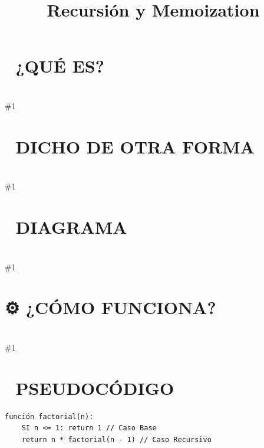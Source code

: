 \documentclass{article}
\newcommand{\quees}[1]{\section*{🤔 ¿QUÉ ES?}\hrulefill \\ \#1}
\newcommand{\dichodeotraforma}[1]{\section*{💬 DICHO DE OTRA FORMA}\hrulefill \\ \#1}
\newcommand{\diagrama}[1]{\section*{🎨 DIAGRAMA}\hrulefill \\ \#1}
\newcommand{\comofunciona}[1]{\section*{⚙️ ¿CÓMO FUNCIONA?}\hrulefill \\ \#1}
\begin{document}
\title{Recursión y Memoization}
\date{}
\maketitle
\quees{Las muñecas rusas Matryoshka 🪆. 

Abres una muñeca grande y adentro hay otra igual pero más pequeña. 
Sigues abriendo muñecas hasta que llegas a la más pequeñita de todas,
la cual ya no tiene nada adentro. Ese es tu "punto de parada".

Recursión es una función que se llama a sí misma para resolver una
versión más pequeña del mismo problema. Sigues bajando niveles hasta
llegar al "Caso Base" (la muñeca más chica), y luego vas regresando 
hacia arriba con las respuestas de cada nivel.}
\dichodeotraforma{La Recursión es un paradigma de programación donde una función se
define en términos de sí misma. 

Para que una función recursiva sea correcta, DEBE tener:
1. Caso Base: La condición de salida que detiene las llamadas.
2. Caso Recursivo: La lógica que rompe el problema en una parte más
   pequeña y hace la auto-llamada.

Si olvidas el Caso Base, la función se llamará infinitamente hasta 
agotar la memoria del sistema (Stack Overflow).}
\diagrama{\begin{verbatim}
Llamada inicial: fact(3)

[ fact(1) ] -> retorna 1 (¡Caso Base!)
[ fact(2) ] -> espera a fact(1)... recibe 1, retorna 2 * 1 = 2
[ fact(3) ] -> espera a fact(2)... recibe 2, retorna 3 * 2 = 6

Resultado Final: 6
\end{verbatim}}
\comofunciona{- Recursión: Más elegante, fácil de leer para problemas de árboles o 
  gráfos. Usa memoria en el "Call Stack" para cada llamada.
- Iteración (Loops): Más eficiente en memoria (O(1) espacio extra). 
  A veces es más difícil de pensar para problemas complejos.

Memoization (La mejora):
Como vimos en DP, si una función recursiva se llama con los mismos 
argumentos muchas veces, guardamos el resultado en un caché 
(Memoization) para que la segunda llamada sea O(1).}
\section*{📝 PSEUDOCÓDIGO}
\hrulefill
\begin{verbatim}
función factorial(n):
    SI n <= 1: return 1 // Caso Base
    return n * factorial(n - 1) // Caso Recursivo
\end{verbatim}
\end{document}
